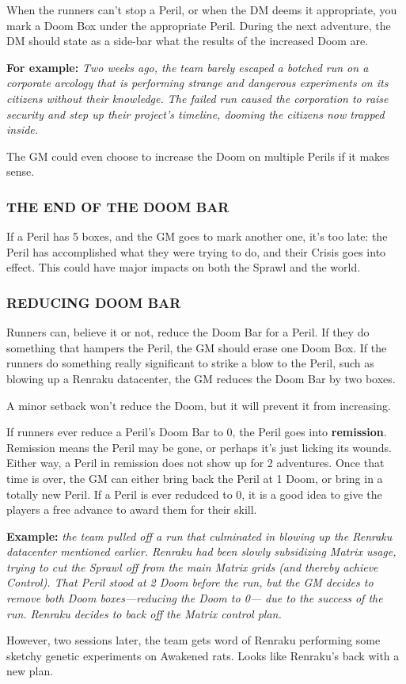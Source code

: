 \documentclass[oneside,10pt]{article}
\begin{document}
\begin{multicols}{2}
When the runners can’t stop a Peril, or when the DM deems
it appropriate, you mark a Doom Box under the appropriate
Peril. During the next adventure, the DM should state as a
side-bar what the results of the increased Doom are.
\begin{adjustwidth*}{.5cm}{.5cm}

\textbf{For example:}\textit{ Two weeks ago, the team barely escaped
a botched run on a corporate arcology that is performing
strange and dangerous experiments on its citizens without
their knowledge. The failed run caused the corporation to
raise security and step up their project’s timeline, dooming
the citizens now trapped inside.}
\end{adjustwidth*}
The GM could even choose to increase the Doom on multiple
Perils if it makes sense.

\subsubsection{THE END OF THE DOOM BAR}
If a Peril has 5 boxes, and the GM goes to mark another one,
it’s too late: the Peril has accomplished what they were trying
to do, and their Crisis goes into effect. This could have major
impacts on both the Sprawl and the world.

\subsubsection{REDUCING DOOM BAR}
Runners can, believe it or not, reduce the Doom Bar for a
Peril. If they do something that hampers the Peril, the GM
should erase one Doom Box. If the runners do something
really significant to strike a blow to the Peril, such as blowing
up a Renraku datacenter, the GM reduces the Doom Bar by
two boxes.

A minor setback won’t reduce the Doom, but it will prevent
it from increasing.

If runners ever reduce a Peril’s Doom Bar to 0, the Peril goes
into \textbf{remission}. Remission means the Peril may be gone, or
perhaps it’s just licking its wounds. Either way, a Peril in remission does not show up for 2 adventures. Once that time
is over, the GM can either bring back the Peril at 1 Doom, or
bring in a totally new Peril. If a Peril is ever redudced to 0, it
is a good idea to give the players a free advance to award
them for their skill.
\begin{adjustwidth*}{.5cm}{.5cm}

\textbf{Example:} \textit{the team pulled off a run that culminated in blowing up the Renraku datacenter mentioned earlier. Renraku
had been slowly subsidizing Matrix usage, trying to cut the
Sprawl off from the main Matrix grids (and thereby achieve
Control). That Peril stood at 2 Doom before the run, but
the GM decides to remove both Doom boxes—reducing
the Doom to 0— due to the success of the run. Renraku
decides to back off the Matrix control plan.}
\end{adjustwidth*}
However, two sessions later, the team gets word of Renraku
performing some sketchy genetic experiments on Awakened
rats. Looks like Renraku’s back with a new plan.


\end{multicols}
\end{document}
